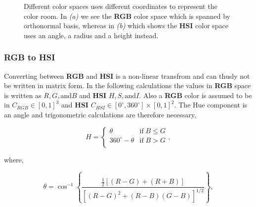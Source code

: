 \begin{figure}[H]
    \centering
    \captionsetup[subfigure]{justification=centering}
    \begin{subfigure}[b]{0.49\textwidth}
        \centering
        
		\caption{}
		\label{fig:color_coordinate_rgb}
    \end{subfigure}
    \begin{subfigure}[b]{0.49\textwidth}
        \centering
        
		\caption{}
		\label{fig:color_coordinate_hsi}
    \end{subfigure}
    \caption{Different color spaces uses different coordinates to represent the color room. In \textit{(a)} we see the \textbf{RGB} color space which is spanned by orthonormal basis, whereas in \textit{(b)} which shows the \textbf{HSI} color space uses an angle, a radius and a height instead.}
    \label{fig:color_coordinate}
\end{figure}

\subsubsection{\textbf{RGB} to \textbf{HSI}}

Converting between \textbf{RGB} and \textbf{HSI} is a non-linear transfrom and can thusly not be written in matrix form. In the following calculations the values in \textbf{RGB} space is written as $R, G, \text{and} B$ and \textbf{HSI} $H, S, \text{and} I$. Also a \textbf{RGB} color is assumed to be in $C_{RGB} \in [0,1]^3$ and \textbf{HSI} $C_{HSI} \in [0^{\circ},360^{\circ}]\times[0,1]^2$. The Hue component is an angle and trigonometric calculations are therefore necessary,

\begin{equation}
H = \left\{\begin{array}{ll}
\theta & \text{if}\; B \leq G \\
360^{\circ} - \theta & \text{if}\; B > G\\
\end{array}\right.,
\end{equation}

where,

\begin{equation}
\theta = \cos^{-1}{\left\{\frac{\frac{1}{2}\left[(R-G)+(R+B)\right]}{\left[(R-G)^2+(R-B)(G-B)\right]^{1/2}}\right\}},
\end{equation}

